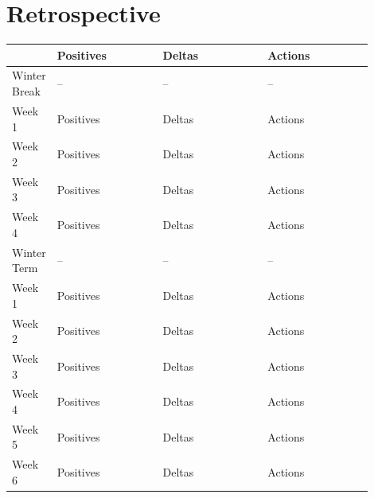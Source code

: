 \documentclass[onecolumn, draftclsnofoot,10pt, compsoc]{IEEEtran}
\begin{document}
\section{Retrospective}
\begin{center}
	\begin{tabular}{| l | p{0.3\linewidth} | p{0.3\linewidth} | p{0.3\linewidth} |}
		\hline
		& Positives & Deltas & Actions \\ \hline
    Winter Break & --  & -- & -- \\ \hline
    Week 1 & Positives & Deltas & Actions \\ \hline
		Week 2 & Positives & Deltas & Actions \\ \hline		%
		Week 3 & Positives & Deltas & Actions \\ \hline
		Week 4 & Positives & Deltas & Actions \\ \hline

    Winter Term & -- & -- & -- \\ \hline
    Week 1 & Positives & Deltas & Actions \\ \hline
		Week 2 & Positives & Deltas & Actions \\ \hline
		Week 3 & Positives & Deltas & Actions \\ \hline
		Week 4 & Positives & Deltas & Actions \\ \hline
    Week 5 & Positives & Deltas & Actions \\ \hline
    Week 6 & Positives & Deltas & Actions \\ \hline

	\end{tabular}
\end{center}

\newpage


\end{document}
